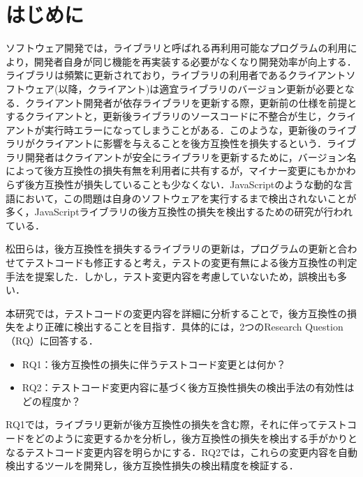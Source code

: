 \documentclass[twocolumn]{jarticle} %
\begin{document}
\maketitle
\thispagestyle{empty} %



\section{はじめに}

ソフトウェア開発では，ライブラリと呼ばれる再利用可能なプログラムの利用により，開発者自身が同じ機能を再実装する必要がなくなり開発効率が向上する．ライブラリは頻繁に更新されており，ライブラリの利用者であるクライアントソフトウェア(以降，クライアント)は適宜ライブラリのバージョン更新が必要となる．クライアント開発者が依存ライブラリを更新する際，更新前の仕様を前提とするクライアントと，更新後ライブラリのソースコードに不整合が生じ，クライアントが実行時エラーになってしまうことがある．このような，更新後のライブラリがクライアントに影響を与えることを後方互換性を損失するという．ライブラリ開発者はクライアントが安全にライブラリを更新するために，バージョン名によって後方互換性の損失有無を利用者に共有するが，マイナー変更にもかかわらず後方互換性が損失していることも少なくない．JavaScriptのような動的な言語において，この問題は自身のソフトウェアを実行するまで検出されないことが多く，JavaScriptライブラリの後方互換性の損失を検出するための研究が行われている．

松田らは，後方互換性を損失するライブラリの更新は，プログラムの更新と合わせてテストコードも修正すると考え，テストの変更有無による後方互換性の判定手法を提案した\cite{matsuda}．しかし，テスト変更内容を考慮していないため，誤検出も多い．

本研究では，テストコードの変更内容を詳細に分析することで，後方互換性の損失をより正確に検出することを目指す．具体的には，2つのResearch Question（RQ）に回答する．

\begin{itemize}
  \item RQ1：後方互換性の損失に伴うテストコード変更とは何か？
  \item RQ2：テストコード変更内容に基づく後方互換性損失の検出手法の有効性はどの程度か？
\end{itemize}

RQ1では，ライブラリ更新が後方互換性の損失を含む際，それに伴ってテストコードをどのように変更するかを分析し，後方互換性の損失を検出する手がかりとなるテストコード変更内容を明らかにする．RQ2では，これらの変更内容を自動検出するツールを開発し，後方互換性損失の検出精度を検証する．
\end{document}
